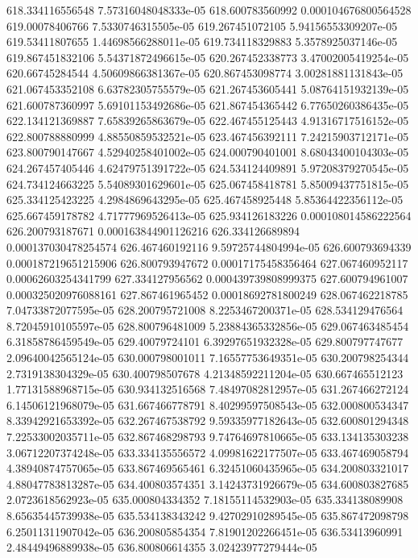 {618.334116556548 7.57316048048333e-05
618.600783560992 0.000104676800564528
619.00078406766 7.5330746315505e-05
619.267451072105 5.94156553309207e-05
619.53411807655 1.44698566288011e-05
619.734118329883 5.3578925037146e-05
619.867451832106 5.54371872496615e-05
620.267452338773 3.47002005419254e-05
620.66745284544 4.50609866381367e-05
620.867453098774 3.00281881131843e-05
621.067453352108 6.63782305755579e-05
621.267453605441 5.08764151932139e-05
621.600787360997 5.69101153492686e-05
621.867454365442 6.77650260386435e-05
622.134121369887 7.65839265863679e-05
622.467455125443 4.91316717516152e-05
622.800788880999 4.88550859532521e-05
623.467456392111 7.24215903712171e-05
623.800790147667 4.52940258401002e-05
624.000790401001 8.68043400104303e-05
624.267457405446 4.62479751391722e-05
624.534124409891 5.97208379270545e-05
624.734124663225 5.54089301629601e-05
625.067458418781 5.85009437751815e-05
625.334125423225 4.2984869643295e-05
625.467458925448 5.85364422356112e-05
625.667459178782 4.71777969526413e-05
625.934126183226 0.000108014586222564
626.200793187671 0.000163844901126216
626.334126689894 0.000137030478254574
626.467460192116 9.59725744804994e-05
626.600793694339 0.000187219651215906
626.800793947672 0.00017175458356464
627.067460952117 0.00062603254341799
627.334127956562 0.000439739808999375
627.600794961007 0.000325020976088161
627.867461965452 0.00018692781800249
628.067462218785 7.04733872077595e-05
628.200795721008 8.2253467200371e-05
628.534129476564 8.72045910105597e-05
628.800796481009 5.23884365332856e-05
629.067463485454 6.31858786459549e-05
629.40079724101 6.39297651932328e-05
629.800797747677 2.09640042565124e-05
630.000798001011 7.16557753649351e-05
630.200798254344 2.7319138304329e-05
630.400798507678 4.21348592211204e-05
630.667465512123 1.77131588968715e-05
630.934132516568 7.48497082812957e-05
631.267466272124 6.14506121968079e-05
631.667466778791 8.40299597508543e-05
632.000800534347 8.33942921653392e-05
632.267467538792 9.59335977182643e-05
632.600801294348 7.22533002035711e-05
632.867468298793 9.74764697810665e-05
633.134135303238 3.06712207374248e-05
633.334135556572 4.09981622177507e-05
633.467469058794 4.38940874757065e-05
633.867469565461 6.32451060435965e-05
634.200803321017 4.88047783813287e-05
634.400803574351 3.14243731926679e-05
634.600803827685 2.0723618562923e-05
635.000804334352 7.18155114532903e-05
635.334138089908 8.65635445739938e-05
635.534138343242 9.42702910289545e-05
635.867472098798 6.25011311907042e-05
636.200805854354 7.81901202266451e-05
636.53413960991 2.48449496889938e-05
636.800806614355 3.02423977279444e-05
}
